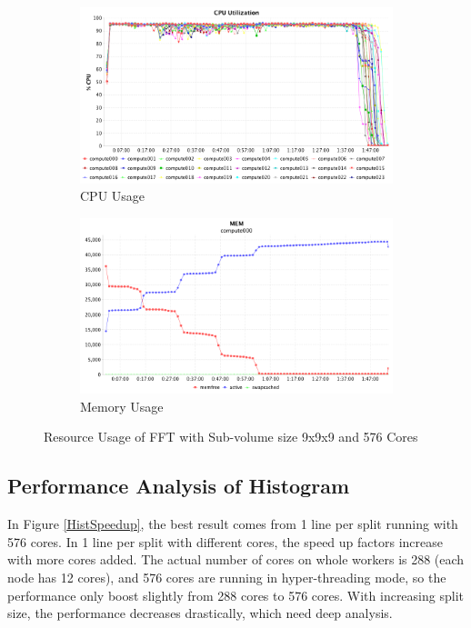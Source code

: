\begin{figure}[!ht]
\centering
\begin{subfigure}{1\textwidth}
  \centering
  \includegraphics[width=1\linewidth]{figures/FFT474_576_CPU.png}
  \caption{CPU Usage}
  \label{FFT474_576_CPU}
\end{subfigure}
\begin{subfigure}{1\textwidth}
  \centering
  \includegraphics[width=1\linewidth]{figures/FFT474_576_MEM.png}
  \caption{Memory Usage}
  \label{FFT474_576_MEM}
\end{subfigure}
\caption{Resource Usage of FFT with Sub-volume size 9x9x9 and 576 Cores}
\label{FFT474_576}
\end{figure}


\subsection{Performance Analysis of Histogram}

In Figure \ref{HistSpeedup}, the best result comes from 1 line per split running with 576 cores. In 1 line per split with different cores, the speed up factors increase with more cores added. The actual number of cores on whole workers is 288 (each node has 12 cores), and 576 cores are running in hyper-threading mode, so the performance only boost slightly from 288 cores to 576 cores. With increasing split size, the performance decreases drastically, which need deep analysis. 

